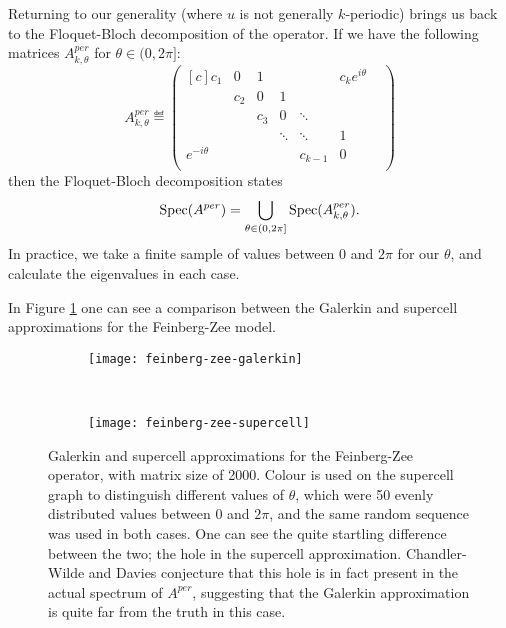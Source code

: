 \documentclass[../main.tex]{subfiles}
\begin{document}
Returning to our generality (where $u$ is not generally $k$-periodic) brings us back to the
Floquet-Bloch decomposition of the operator. If we have the following matrices
$A^{per}_{k, \theta}$ for $\theta \in (0, 2 \pi]$:
  $$ 
  A^{per}_{k, \theta} \eqdef
  \begin{pmatrix*}[c]
    c_1 & 0 & 1 & & & c_{k} e^{i \theta}\\
    & c_2 & 0 & 1 & & & \\
    & & c_3 & 0 & \ddots & & \\
    & & & \ddots & \ddots & 1 & \\
    e^{- i \theta} & & & & c_{k-1} & 0 \\
  \end{pmatrix*} 
  $$
then the Floquet-Bloch decomposition states 
  $$\mathrm{Spec}(A^{per}) = \bigcup_{\theta \in (0, 2 \pi]} \mathrm{Spec}(A^{per}_{k, \theta}).$$
In practice, we take a finite sample of values between 0 and $2 \pi$ for our
$\theta$, and calculate the eigenvalues in each case. 

In Figure \ref{fig:feinberg-zee} one can see a comparison between the Galerkin
and supercell approximations for the Feinberg-Zee model. 

\begin{figure}[h!]
\centering
\begin{subfigure}{0.9\textwidth}
  \texttt{[image: feinberg-zee-galerkin]}
  \end{subfigure}\\
  \begin{subfigure}{0.9\textwidth}
  \texttt{[image: feinberg-zee-supercell]} \end{subfigure}
  \caption{Galerkin and supercell approximations for the Feinberg-Zee operator,
	with matrix size of 2000. Colour is used on the supercell graph to
	distinguish different values of $\theta$, which were 50 evenly
	distributed values between $0$ and $2 \pi$, and the same random
	sequence was used in both cases. One can see the quite startling
	difference between the two; the hole in the supercell approximation.
	Chandler-Wilde and Davies \cite{chandler-wilde2012spectrum} conjecture
	that this hole is in fact present in the actual spectrum of $A^{per}$,
  suggesting that the Galerkin approximation is quite far from the truth
  in this case.}
\label{fig:feinberg-zee}
\end{figure}
\clearpage
\end{document}
